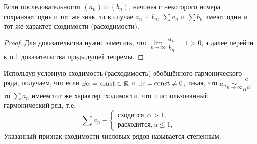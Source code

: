\begin{consequence}
	Если последовательности $(a_n)$ и $(b_n)$, начиная с некоторого номера сохраняют один и тот же
	знак. то в случае $a_n \sim b_n$, $\sum a_n$ и $\sum b_n$ имеют один и тот же характер сходимости (расходимости).
\end{consequence}
\begin{proof}
	Для доказательства нужно заметить, что $\lim\limits_{n \to \infty}\dfrac{a_n}{b_n} = 1 > 0$, а далее перейти к п.1
	доказательства предыдущей теоремы.
\end{proof}

\begin{note}
	Используя условную сходимость (расходимость) обобщённого гармонического ряда, получаем, что если
	$\exists \alpha = \operatorname{\text{const}} \in \mathbb{R}^{}$ и $\exists c = \operatorname{\text{const}} \neq 0$, такая, что $a_n \underset{n \to \infty}{\sim} \dfrac{c}{n^\alpha}$,
	то $\sum a_n$ имеем тот же характер сходимости, что и использованный гармонический ряд, т.е.
	\begin{equation*}
		\sum a_n -
		\begin{cases}
			\text{сходится}, \alpha > 1,\\
			\text{расходится}, \alpha \leqslant 1,
		\end{cases}
	\end{equation*}
	Указанный признак сходимости числовых рядов называется степенным.
\end{note}

